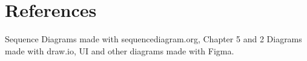 \chapter{References}

Sequence Diagrams made with sequencediagram.org, Chapter 5 and 2 Diagrams made with draw.io, UI and other diagrams made with Figma.